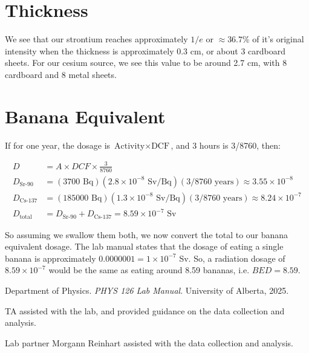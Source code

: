 \documentclass[12pt]{article}
\begin{document}
\section{Thickness}

We see that our strontium reaches approximately $1/e$ or $\approx 36.7$\% of it's original intensity when
the thickness is approximately 0.3 cm, or about 3 cardboard sheets. For our cesium source, we see this value to be
around 2.7 cm, with 8 cardboard and 8 metal sheets.

\section{Banana Equivalent}

If for one year, the dosage is $\text{Activity} \times \text{DCF}$, and 3 hours is 3/8760, then:

\begin{align*}
    D &= A \times DCF \times \frac{3}{8760} \\
    D_{\text{Sr-90}} &= (3700\text{ Bq})(2.8 \times 10^{-8}\text{ Sv/Bq})(3/8760\text{ years}) \approx 3.55 \times 10^{-8} \\
    D_{\text{Cs-137}} &=  (185000\text{ Bq})(1.3 \times 10^{-8}\text{ Sv/Bq})(3/8760\text{ years}) \approx 8.24 \times 10^{-7} \\
    D_{\text{total}} &= D_{\text{Sr-90}} + D_{\text{Cs-137}} = 8.59 \times 10^{-7}\text{ Sv}
\end{align*}

So assuming we swallow them both, we now convert the total to our banana equivalent dosage. The lab manual states that the dosage of eating
a single banana is approximately $0.0000001 = 1 \times 10^{-7}$ Sv. So, a radiation dosage of 
$8.59 \times 10^{-7}$ would be the same as eating around 8.59 bananas, i.e. $BED = 8.59$.

\begin{thebibliography}{9}
    Department of Physics. \textit{PHYS 126 Lab Manual}. University of Alberta, 2025.

    TA assisted with the lab, and provided guidance on the data collection and analysis.

    Lab partner Morgann Reinhart assisted with the data collection and analysis.
    
\end{thebibliography}
\end{document}
